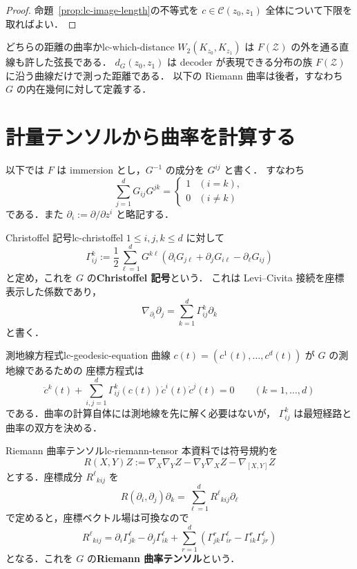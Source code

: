 \begin{proof}
  命題~\ref{prop:lc-image-length}の不等式を
  $c\in\mathcal{C}(z_0,z_1)$ 全体について下限を取ればよい．
\end{proof}

\begin{remark}{どちらの距離の曲率か}{lc-which-distance}
  $W_2(K_{z_0},K_{z_1})$ は $F(\mathcal{Z})$ の外を通る直線も許した弦長である．
  $d_G(z_0,z_1)$ は decoder が表現できる分布の族
  $F(\mathcal{Z})$ に沿う曲線だけで測った距離である．
  以下の Riemann 曲率は後者，すなわち $G$ の内在幾何に対して定義する．
\end{remark}

\section{計量テンソルから曲率を計算する}
\label{sec:lc-curvature-formulas}

以下では $F$ は immersion とし，$G^{-1}$ の成分を $G^{ij}$ と書く．
すなわち
\[
  \sum_{j=1}^dG_{ij}G^{jk}=\begin{cases}1&(i=k),\\0&(i\neq k)\end{cases}
\]
である．また $\partial_i:=\partial/\partial z^i$ と略記する．

\begin{definition}{Christoffel 記号}{lc-christoffel}
  $1\leq i,j,k\leq d$ に対して
  \[
    \boxed{
      \Gamma^k_{ij}
      :=\frac12\sum_{\ell=1}^dG^{k\ell}
      \left(
        \partial_iG_{j\ell}
        +\partial_jG_{i\ell}
        -\partial_\ell G_{ij}
      \right)
    }
  \]
  と定め，これを $G$ の\textbf{Christoffel 記号}という．
  これは Levi--Civita 接続を座標表示した係数であり，
  \[
    \nabla_{\partial_i}\partial_j
    =\sum_{k=1}^d\Gamma^k_{ij}\partial_k
  \]
  と書く．
\end{definition}

\begin{remark}{測地線方程式}{lc-geodesic-equation}
  曲線 $c(t)=(c^1(t),\dots,c^d(t))$ が $G$ の測地線であるための
  座標方程式は
  \[
    \ddot c^k(t)
    +\sum_{i,j=1}^d
      \Gamma^k_{ij}(c(t))\dot c^i(t)\dot c^j(t)=0
    \qquad(k=1,\dots,d)
  \]
  である．曲率の計算自体には測地線を先に解く必要はないが，
  $\Gamma^k_{ij}$ は最短経路と曲率の双方を決める．
\end{remark}

\begin{definition}{Riemann 曲率テンソル}{lc-riemann-tensor}
  本資料では符号規約を
  \[
    R(X,Y)Z
    :=\nabla_X\nabla_YZ-\nabla_Y\nabla_XZ-\nabla_{[X,Y]}Z
  \]
  とする．座標成分 $R^\ell{}_{kij}$ を
  \[
    R(\partial_i,\partial_j)\partial_k
    =\sum_{\ell=1}^dR^\ell{}_{kij}\partial_\ell
  \]
  で定めると，座標ベクトル場は可換なので
  \[
    \boxed{
      R^\ell{}_{kij}
      =\partial_i\Gamma^\ell_{jk}
       -\partial_j\Gamma^\ell_{ik}
       +\sum_{r=1}^d
        \left(
          \Gamma^r_{jk}\Gamma^\ell_{ir}
          -\Gamma^r_{ik}\Gamma^\ell_{jr}
        \right)
    }
  \]
  となる．これを $G$ の\textbf{Riemann 曲率テンソル}という．
\end{definition}

